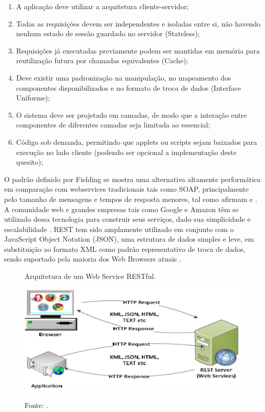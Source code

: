 \begin{enumerate}
	\item {A aplicação deve utilizar a arquitetura cliente-servidor;}
	\item {Todas as requisições devem ser independentes e isoladas entre si, não havendo nenhum estado de sessão guardado no servidor (Stateless);}
	\item {Requisições já executadas previamente podem ser mantidas em memória para reutilização futura por chamadas equivalentes (Cache);}
	\item {Deve existir uma padronização na manipulação, no mapeamento dos componentes disponibilizados e no formato de troca de dados (Interface Uniforme);}
	\item {O sistema deve ser projetado em camadas, de modo que a interação entre componentes de diferentes camadas seja limitada ao essencial;}
	\item {Código sob demanda, permitindo que applets ou scripts sejam baixados para execução no lado cliente (podendo ser opcional a implementação deste quesito);}
\end{enumerate}

O padrão definido por Fielding se mostra uma alternativa altamente performática em comparação com webservices tradicionais tais como SOAP, principalmente pelo tamanho de mensagens e tempos de resposta menores, tal como afirmam  e . A comunidade web e grandes empresas tais como Google e Amazon têm se utilizado dessa tecnologia para construir seus serviços, dado sua simplicidade e escalabilidade \cite{wagh2014hybrid}. REST tem sido amplamente utilizado em conjunto com o JavaScript Object Notation (JSON), uma estrutura de dados simples e leve, em substituição ao formato XML como padrão representativo de troca de dados, sendo suportado pela maioria dos Web Browsers atuais \cite{knutsen2018}.

\begin{figure}[h]
	\caption{Arquitetura de um Web Service RESTful.}
	\caption*{Fonte: .}
	\centering %
	\includegraphics[width=12cm]{resources/webservices.png} %
	\label{figura:webservices}	
\end{figure}

